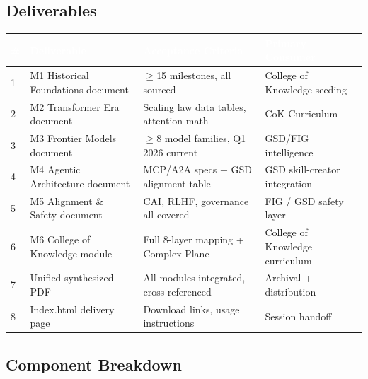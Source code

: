 \documentclass[11pt,letterpaper]{article}
\newcommand{\tableheader}[1]{\textbf{\sffamily\textcolor{white}{#1}}}
\begin{document}
\subsection{Deliverables}

\begin{center}
\begin{tabularx}{\textwidth}{C{0.5cm}L{3.5cm}L{4cm}L{4cm}}
\toprule
{}
\tableheader{\#} & \tableheader{Deliverable} & \tableheader{Acceptance Criteria} & \tableheader{Primary Consumer} \\
 & M1 Historical Foundations document & $\geq$15 milestones, all sourced & College of Knowledge seeding \\
2 & M2 Transformer Era document & Scaling law data tables, attention math & CoK Curriculum \\
3 & M3 Frontier Models document & $\geq$8 model families, Q1 2026 current & GSD/FIG intelligence \\
4 & M4 Agentic Architecture document & MCP/A2A specs + GSD alignment table & GSD skill-creator integration \\
5 & M5 Alignment \& Safety document & CAI, RLHF, governance all covered & FIG / GSD safety layer \\
6 & M6 College of Knowledge module & Full 8-layer mapping + Complex Plane & College of Knowledge curriculum \\
7 & Unified synthesized PDF & All modules integrated, cross-referenced & Archival + distribution \\
8 & Index.html delivery page & Download links, usage instructions & Session handoff \\
\bottomrule
\end{tabularx}
\end{center}

\subsection{Component Breakdown}
\end{document}
